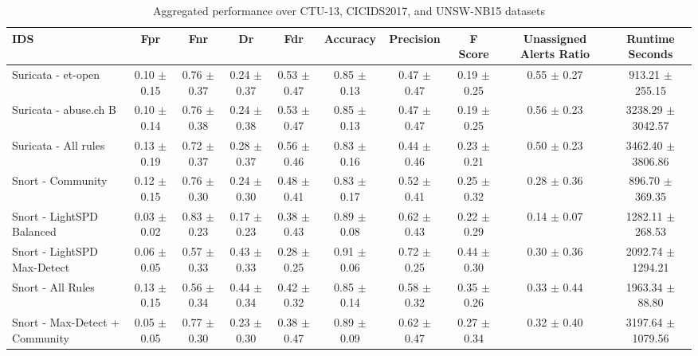 \begin{table}[t]
    \centering
    \caption{Aggregated performance over CTU-13, CICIDS2017, and UNSW-NB15 datasets}
    \label{tab:ids_performance_aggregated}
    \renewcommand{\arraystretch}{1.5}
    \begin{tabular}{lccccccccc}
        \toprule
        \textbf{IDS} & \textbf{Fpr} & \textbf{Fnr} & \textbf{Dr} & \textbf{Fdr} & \textbf{Accuracy} & \textbf{Precision} & \textbf{F Score} & \textbf{Unassigned Alerts Ratio} & \textbf{Runtime Seconds} \\
        \midrule
        Suricata - et-open & 0.10 $\pm$ 0.15 & 0.76 $\pm$ 0.37 & 0.24 $\pm$ 0.37 & 0.53 $\pm$ 0.47 & 0.85 $\pm$ 0.13 & 0.47 $\pm$ 0.47 & 0.19 $\pm$ 0.25 & 0.55 $\pm$ 0.27 & 913.21 $\pm$ 255.15 \\
        Suricata - abuse.ch B & 0.10 $\pm$ 0.14 & 0.76 $\pm$ 0.38 & 0.24 $\pm$ 0.38 & 0.53 $\pm$ 0.47 & 0.85 $\pm$ 0.13 & 0.47 $\pm$ 0.47 & 0.19 $\pm$ 0.25 & 0.56 $\pm$ 0.23 & 3238.29 $\pm$ 3042.57 \\
        Suricata - All rules & 0.13 $\pm$ 0.19 & 0.72 $\pm$ 0.37 & 0.28 $\pm$ 0.37 & 0.56 $\pm$ 0.46 & 0.83 $\pm$ 0.16 & 0.44 $\pm$ 0.46 & 0.23 $\pm$ 0.21 & 0.50 $\pm$ 0.23 & 3462.40 $\pm$ 3806.86 \\
        Snort - Community & 0.12 $\pm$ 0.15 & 0.76 $\pm$ 0.30 & 0.24 $\pm$ 0.30 & 0.48 $\pm$ 0.41 & 0.83 $\pm$ 0.17 & 0.52 $\pm$ 0.41 & 0.25 $\pm$ 0.32 & 0.28 $\pm$ 0.36 & 896.70 $\pm$ 369.35 \\
        Snort - LightSPD Balanced & 0.03 $\pm$ 0.02 & 0.83 $\pm$ 0.23 & 0.17 $\pm$ 0.23 & 0.38 $\pm$ 0.43 & 0.89 $\pm$ 0.08 & 0.62 $\pm$ 0.43 & 0.22 $\pm$ 0.29 & 0.14 $\pm$ 0.07 & 1282.11 $\pm$ 268.53 \\
        Snort - LightSPD Max-Detect & 0.06 $\pm$ 0.05 & 0.57 $\pm$ 0.33 & 0.43 $\pm$ 0.33 & 0.28 $\pm$ 0.25 & 0.91 $\pm$ 0.06 & 0.72 $\pm$ 0.25 & 0.44 $\pm$ 0.30 & 0.30 $\pm$ 0.36 & 2092.74 $\pm$ 1294.21 \\
        Snort - All Rules & 0.13 $\pm$ 0.15 & 0.56 $\pm$ 0.34 & 0.44 $\pm$ 0.34 & 0.42 $\pm$ 0.32 & 0.85 $\pm$ 0.14 & 0.58 $\pm$ 0.32 & 0.35 $\pm$ 0.26 & 0.33 $\pm$ 0.44 & 1963.34 $\pm$ 88.80 \\
        Snort - Max-Detect + Community & 0.05 $\pm$ 0.05 & 0.77 $\pm$ 0.30 & 0.23 $\pm$ 0.30 & 0.38 $\pm$ 0.47 & 0.89 $\pm$ 0.09 & 0.62 $\pm$ 0.47 & 0.27 $\pm$ 0.34 & 0.32 $\pm$ 0.40 & 3197.64 $\pm$ 1079.56 \\
        \bottomrule
    \end{tabular}
\end{table}
